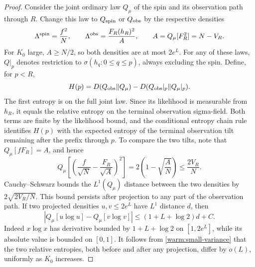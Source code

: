 \begin{proof}
Consider the joint ordinary law \(Q_\mu\) of the spin and its observation
path through \(R\).  Change this law to \(Q_{\rm spin}\) or \(Q_{\rm obs}\)
by the respective densities
\[
 \Lambda^{\rm spin}=\frac{f^2}{N},
 \qquad
 \Lambda^{\rm obs}=\frac{F_R(h_R)^2}{A},
 \qquad
 A=Q_\mu[F_R^2]=N-V_R .
\]
For \(K_0\) large, \(A\ge N/2\), so both densities are at most \(2e^L\).
For any of these laws, \(Q|_p\) denotes restriction to
\(\sigma(h_q:0\le q\le p)\), always excluding
the spin.  Define, for \(p<R\),
\begin{equation}\label{warm:residual-observation-entropy}
 H(p)=D(Q_{\rm obs}\Vert Q_\mu)
       -D(Q_{\rm obs}|_p\Vert Q_\mu|_p).
\end{equation}
The first entropy is on the full joint law.  Since its likelihood is
measurable from \(h_R\), it equals the relative entropy on the terminal
observation sigma-field.  Both terms are finite by the likelihood bound,
and the conditional entropy chain rule identifies \(H(p)\) with the
expected entropy of the terminal observation tilt remaining after the
prefix through \(p\).
To compare the two tilts, note that \(Q_\mu[fF_R]=A\), and hence
\[
 Q_\mu\left[\left(\frac f{\sqrt N}
                  -\frac{F_R}{\sqrt A}\right)^2\right]
 =2\left(1-\sqrt{\frac AN}\right)\le\frac{2V_R}{N}.
\]
Cauchy--Schwarz bounds the \(L^1(Q_\mu)\) distance between the two
densities by \(2\sqrt{2V_R/N}\).  This bound persists after projection
to any part of the observation path.  If two projected densities
\(u,v\le2e^L\) have \(L^1\) distance \(d\), then
\begin{equation}
 \left|Q_\mu[u\log u]-Q_\mu[v\log v]\right|
 \le (1+L+\log2)d+C.                                      \label{warm:entropy-continuity}
\end{equation}
Indeed \(x\log x\) has derivative bounded by \(1+L+\log2\) on
\([1,2e^L]\), while its absolute value is bounded on \([0,1]\).
It follows from \eqref{warm:small-variance} that the two relative
entropies, both before and after any projection, differ by \(o(L)\),
uniformly as \(K_0\) increases.


\end{proof}
